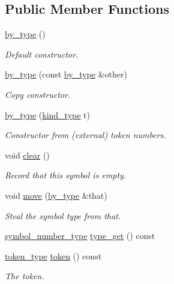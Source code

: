 \subsection*{Public Member Functions}
\begin{DoxyCompactItemize}
\item 
\hyperlink{structyy_1_1genesyspp__parser_1_1by__type_a76eabb9eead69b90ad4b430a345e88ef}{by\-\_\-type} ()
\begin{DoxyCompactList}\small\item\em Default constructor. \end{DoxyCompactList}\item 
\hyperlink{structyy_1_1genesyspp__parser_1_1by__type_a5392a679bcd401fe0243a69e7f422427}{by\-\_\-type} (const \hyperlink{structyy_1_1genesyspp__parser_1_1by__type}{by\-\_\-type} \&other)
\begin{DoxyCompactList}\small\item\em Copy constructor. \end{DoxyCompactList}\item 
\hyperlink{structyy_1_1genesyspp__parser_1_1by__type_af6af5f6a0a06e2fbb3b195bacf6f03d0}{by\-\_\-type} (\hyperlink{structyy_1_1genesyspp__parser_1_1token_a473652e1e69da7c38a16e5d2aaac94b9}{kind\-\_\-type} t)
\begin{DoxyCompactList}\small\item\em Constructor from (external) token numbers. \end{DoxyCompactList}\item 
void \hyperlink{structyy_1_1genesyspp__parser_1_1by__type_a8d4da60977a39a1d052686ee598bbbe8}{clear} ()
\begin{DoxyCompactList}\small\item\em Record that this symbol is empty. \end{DoxyCompactList}\item 
void \hyperlink{structyy_1_1genesyspp__parser_1_1by__type_a63b1bfb65f247edb690819fedd8ae756}{move} (\hyperlink{structyy_1_1genesyspp__parser_1_1by__type}{by\-\_\-type} \&that)
\begin{DoxyCompactList}\small\item\em Steal the symbol type from {\itshape that}. \end{DoxyCompactList}\item 
\hyperlink{classyy_1_1genesyspp__parser_a0910f625bff73225656c83490dd5fe9f}{symbol\-\_\-number\-\_\-type} \hyperlink{structyy_1_1genesyspp__parser_1_1by__type_ac56d30e24d923209a227d356e007e34c}{type\-\_\-get} () const 
\item 
\hyperlink{structyy_1_1genesyspp__parser_1_1token_a473652e1e69da7c38a16e5d2aaac94b9}{token\-\_\-type} \hyperlink{structyy_1_1genesyspp__parser_1_1by__type_a24ca814699206c1c9d29e22b1a4d6cfc}{token} () const 
\begin{DoxyCompactList}\small\item\em The token. \end{DoxyCompactList}\end{DoxyCompactItemize}
